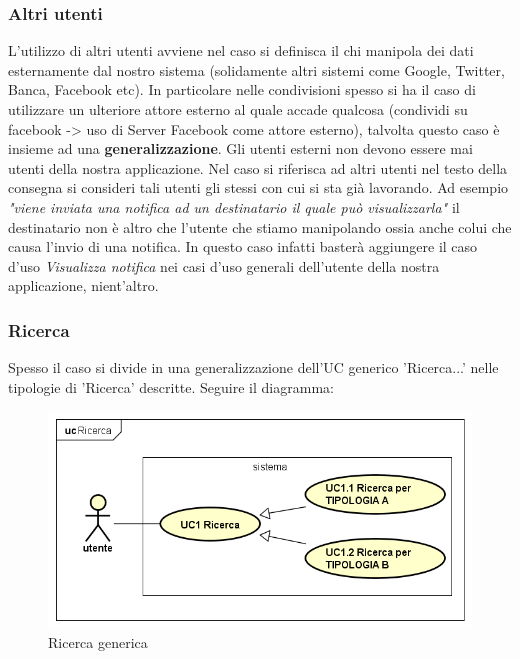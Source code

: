 \documentclass[a4paper,11pt]{article}
\begin{document}
					
								
	\subsubsection{Altri utenti} 
	L'utilizzo di altri utenti avviene nel caso si definisca il chi manipola dei dati esternamente dal nostro sistema (solidamente altri sistemi come Google, Twitter, Banca, Facebook etc). In particolare nelle condivisioni spesso si ha il caso di utilizzare un ulteriore attore esterno al quale accade qualcosa (condividi su facebook -> uso di Server Facebook come attore esterno), talvolta questo caso è insieme ad una \textbf{generalizzazione}.
	Gli utenti esterni non devono essere mai utenti della nostra applicazione. Nel caso si riferisca ad altri utenti nel testo della consegna si consideri tali utenti gli stessi con cui si sta già lavorando. Ad esempio \textit{"viene inviata una notifica ad un destinatario il quale può visualizzarla"} il destinatario non è altro che l'utente che stiamo manipolando ossia anche colui che causa l'invio di una notifica. In questo caso infatti basterà aggiungere il caso d'uso \textit{Visualizza notifica} nei casi d'uso generali dell'utente della nostra applicazione, nient'altro.
					
	\newpage			
	\subsubsection{Ricerca}
	Spesso il caso si divide in una generalizzazione dell'UC generico 'Ricerca...' nelle tipologie di 'Ricerca' descritte. Seguire il diagramma:
	
		\begin{figure} [h]
			\centering
			\includegraphics[scale=0.50]{UseCasePattern/Ricerca/Ricerca}
			\caption{Ricerca generica}
		\end{figure}
			
\end{document}
